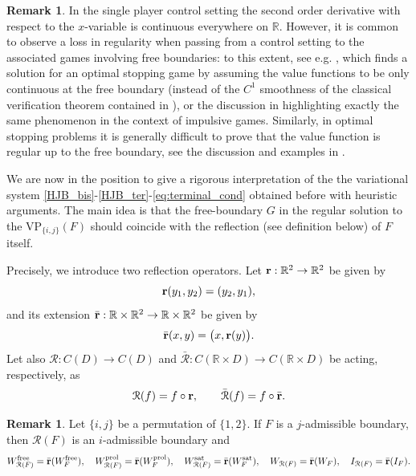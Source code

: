 \documentclass[10pt]{article}
\numberwithin{equation}{section}
\theoremstyle{plain}
\numberwithin{theorem}{section}
\theoremstyle{definition}
\newtheorem{remark}[theorem]{Remark}
\def \R {\mathbb{R}}
\newcommand{\<}{\langle}
\renewcommand{\>}{\rangle}
\renewcommand{\(}{\left(}
\renewcommand{\)}{\right)}
\def \R  {{\mathbb {R}}}
\def \R {{\mathbb {R}}}
\def\cR{{\mathcal R}}
\begin{document}
{{{\begin{remark}
In the single player control setting \cite{MR4305783} the second order derivative with respect to the $x$-variable is continuous everywhere {on $\R$}. However, it is common to observe a loss in regularity when passing from a control setting to the associated games involving free boundaries: to this extent, see e.g.  \cite{chen2013nonzero}, which finds a solution for an optimal stopping game by assuming the value functions to be only continuous at the free boundary (instead of the $C^1$ smoothness of the classical verification theorem contained in 
), or the discussion in \cite{MR4066995} highlighting exactly the same phenomenon in the context of impulsive games. Similarly, in optimal {stopping problems} it is generally difficult to prove that the value function is regular up to the free boundary, see the discussion and examples in \cite{MR4620174}.
\end{remark}

We are now in the position to give a rigorous interpretation of the the variational system \eqref{HJB_bis}-\eqref{HJB_ter}-\eqref{eq:terminal_cond} obtained before with heuristic arguments. The main idea is that the free-boundary $G$ in the regular solution to the  $\text{VP}_{\{i,j\}}(F)$ should coincide with the reflection (see definition below) of $F$ itself.

Precisely, we introduce two reflection operators. Let ${\bf r}: \R^2 \to \R^2$ be given by
\begin{equation}%
{\bf r}(y_1,y_2) = (y_2,y_1),
\end{equation} 
and its extension $\bar{\bf r}: \R \times \R^2 \to  \R \times \R^2$ be given by 
\begin{equation}%
\bar{\bf r} (x,y) =  \big(x,{\bf r}(y)\big).
\end{equation}
Let also %
$\cR: C(D) \to C(D)$ and $\bar\cR: C(\R\times D) \to C(\R\times D)$ be acting, respectively, as %
\begin{equation}%
\cR(f) = f \circ {\bf r},\qquad \bar\cR(f) = f \circ \bar{\bf r}.
\end{equation}
\begin{remark}
Let $\{i,j\}$ be a permutation of $\{1,2\}$. 
If $F$ is a $j$-admissible boundary, then $\cR(F)$ is an $i$-admissible boundary and 
\begin{equation}%
W^{\text{free}}_{\cR(F)} = \bar{\bf r}(W^{\text{free}}_{F}), \quad W^{\text{prol}}_{\cR(F)} = \bar {\bf r}(W^{\text{prol}}_{F}), \quad W^{\text{sat}}_{\cR(F)} = \bar {\bf r}(W^{\text{sat}}_{F}), \quad W_{\cR(F)} = \bar {\bf r}(W_{F}),\quad I_{\cR(F)} = \bar {\bf r}(I_{F}). 
\end{equation}
\end{remark}


}}}
\end{document}
